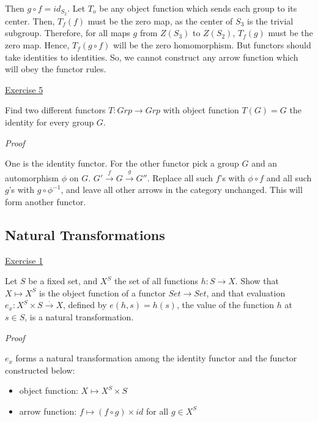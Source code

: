 \documentclass[11pt]{article}
\begin{document}
Then $g \circ f = id_{S_2}$. Let $T_o$ be any object function which sends each group to its center. Then, $T_f(f)$ must be the zero map, as the center of $S_3$ is the trivial subgroup. Therefore, for all maps $g$ from $Z(S_3)$ to $Z(S_2)$, $T_f(g)$ must be the zero map. Hence, $T_f(g \circ f)$ will be the zero homomorphism. But functors should take identities to identities. So, we cannot construct any arrow function which will obey the functor rules. 

\vspace{2mm}
\noindent
\underline{Exercise 5}
\vspace{2mm}

Find two different functors $T: Grp \rightarrow Grp$ with object function $T(G) = G$ the identity for every group $G$.

\vspace{2mm}
\noindent
\emph{Proof}

One is the identity functor. For the other functor pick a group $G$ and an automorphism $\phi$ on $G$. 
$G' \xrightarrow{f} G \xrightarrow{g} G''$. Replace all such $f$'s with $\phi \circ f$ and all such $g$'s with $g \circ \phi^{-1}$, and leave all other arrows in the category unchanged. This will form another functor. 






\newpage
\subsection{Natural Transformations}

\vspace{2mm}
\noindent
\underline{Exercise 1}
\vspace{2mm}

Let $S$ be a fixed set, and $X^S$ the set of all functions $h: S \rightarrow X$. Show that $X \mapsto X^S$
is the object function of a functor $Set \rightarrow Set$, and that evaluation $e_x : X^S \times S \xrightarrow{.} X$,
defined by $e(h, s) = h(s)$, the value of the function $h$ at $s \in S$, is a natural transformation.

\vspace{2mm}
\noindent
\emph{Proof}

$e_x$ forms a natural transformation among the identity functor and the functor constructed below:
\begin{itemize}
	\item object function: $X \mapsto X^S \times S$
	\item arrow function: $f \mapsto (f \circ g) \times id$ for all $g \in X^S$
\end{itemize}
\end{document}
